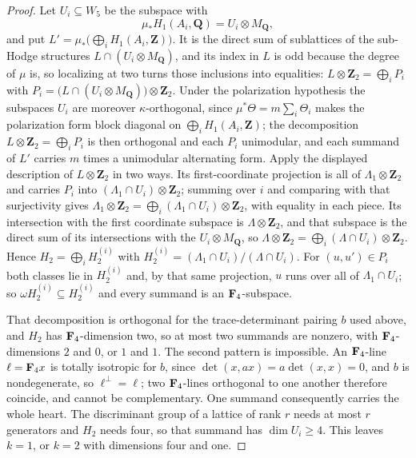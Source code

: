 \begin{proof}
Let \(U_i\subseteq W_5\) be the subspace with
\[
 \mu_*H_1(A_i,\mathbf Q)=U_i\otimes M_{\mathbf Q},
\]
and put \(L'=\mu_*\bigl(\bigoplus_iH_1(A_i,\mathbf Z)\bigr)\).  It is the
direct sum of sublattices of the sub-Hodge structures
\(L\cap(U_i\otimes M_{\mathbf Q})\), and its index in \(L\) is odd because the
degree of \(\mu\) is, so localizing at two turns those inclusions into
equalities:
\(L\otimes\mathbf Z_2=\bigoplus_iP_i\) with
\(P_i=\bigl(L\cap(U_i\otimes M_{\mathbf Q})\bigr)\otimes\mathbf Z_2\).  Under
the polarization hypothesis the subspaces \(U_i\) are moreover
\(\kappa\)-orthogonal, since \(\mu^*\Theta=m\sum_i\Theta_i\) makes the
polarization form block diagonal on \(\bigoplus_iH_1(A_i,\mathbf Z)\); the
decomposition \(L\otimes\mathbf Z_2=\bigoplus_iP_i\) is then orthogonal and
each \(P_i\) unimodular, and each summand of \(L'\) carries \(m\) times a
unimodular alternating form.  Apply the displayed description of
\(L\otimes\mathbf Z_2\) in two
ways.  Its first-coordinate projection is all of
\(\Lambda_1\otimes\mathbf Z_2\) and carries \(P_i\) into
\((\Lambda_1\cap U_i)\otimes\mathbf Z_2\); summing over \(i\) and comparing
with that surjectivity gives
\(\Lambda_1\otimes\mathbf Z_2
 =\bigoplus_i(\Lambda_1\cap U_i)\otimes\mathbf Z_2\), with equality in each
piece.  Its intersection with
the first coordinate subspace is \(\Lambda\otimes\mathbf Z_2\), and that
subspace is the direct sum of its intersections with the
\(U_i\otimes M_{\mathbf Q}\), so
\(\Lambda\otimes\mathbf Z_2=\bigoplus_i(\Lambda\cap U_i)\otimes\mathbf Z_2\).
Hence \(H_2=\bigoplus_iH_2^{(i)}\) with
\(H_2^{(i)}=(\Lambda_1\cap U_i)/(\Lambda\cap U_i)\).  For \((u,u')\in P_i\)
both classes lie in \(H_2^{(i)}\) and, by that same projection, \(u\) runs
over all of \(\Lambda_1\cap U_i\); so \(\omega H_2^{(i)}\subseteq H_2^{(i)}\)
and every summand is an \(\mathbf F_4\)-subspace.

That decomposition is orthogonal for the trace-determinant pairing \(b\) used
above, and \(H_2\) has \(\mathbf F_4\)-dimension two, so at most two summands are
nonzero, with \(\mathbf F_4\)-dimensions \(2\) and \(0\), or \(1\) and \(1\).  The
second pattern is impossible.  An \(\mathbf F_4\)-line \(\ell=\mathbf F_4x\) is totally
isotropic for \(b\), since \(\det(x,ax)=a\det(x,x)=0\), and \(b\) is
nondegenerate, so \(\ell^\perp=\ell\); two \(\mathbf F_4\)-lines orthogonal to one
another therefore coincide, and cannot be complementary.  One summand
consequently carries the whole heart.  The discriminant group of a lattice of
rank \(r\) needs at most \(r\) generators and \(H_2\) needs four, so that
summand has \(\dim U_i\ge4\).  This leaves \(k=1\), or \(k=2\) with dimensions
four and one.


\end{proof}
